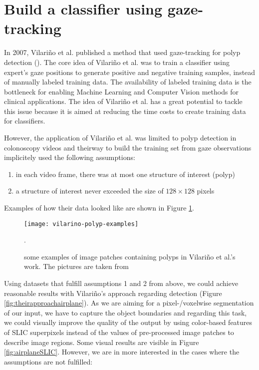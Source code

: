 \section{Build a classifier using gaze-tracking}
In 2007, Vilari\~no et al. published a method that used gaze-tracking for polyp detection (\cite{vilarino2007automatic}). The core idea of Vilari\~no et al. was to train a classifier using expert's gaze positions to generate positive and negative training samples, instead of manually labeled training data. 
The availability of labeled training data is the bottleneck for enabling Machine Learning and Computer Vision methods for clinical applications. 
The idea of Vilari\~no et al. has a great potential to tackle this issue because it is aimed at reducing the time costs to create training data for classifiers. 

However, the application of Vilari\~no et al. was limited to polyp detection in colonoscopy videos and theirway to build the training set from gaze observations implicitely used the following assumptions:
\begin{enumerate}
 \item in each video frame, there was at most one structure of interest (polyp)
 \item a structure of interest never exceeded the size of $128 \times 128$ pixels
\end{enumerate}
Examples of how their data looked like are shown in Figure \ref{fig:vilarinoPolypExamples}.

\begin{figure}[ht]
	\centering
	\texttt{[image: vilarino-polyp-examples]}
	\caption{some examples of image patches containing polyps in Vilari\~no et al.'s work. The pictures are taken from \cite{vilarino2007automatic}}.
	\label{fig:vilarinoPolypExamples}
\end{figure}

Using datasets that fulfill assumptions 1 and 2 from above, we could achieve reasonable results with Vilari\~no's approach regarding detection (Figure \ref{fig:theirapproachairplane}). As we are aiming for a pixel-/voxelwise segmentation of our input, we have to capture the object boundaries and regarding this task, we could visually improve the quality of the output by using color-based features of SLIC superpixels instead of the values of pre-processed image patches to describe image regions. Some visual results are visible in Figure \ref{fig:airplaneSLIC}. However, we are in more interested in the cases where the assumptions are not fulfilled:

